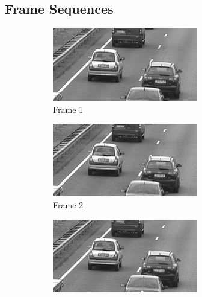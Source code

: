 \documentclass{article}
\begin{document}
\begin{enumerate}
\subsection{Frame Sequences}
\begin{figure}[h!]
    \centering
    \begin{subfigure}{0.24\textwidth}
        \centering
        \includegraphics[width=\linewidth]{../images/cars/frame = 1.png}
        \caption{Frame 1}
    \end{subfigure}
    \begin{subfigure}{0.24\textwidth}
        \centering
        \includegraphics[width=\linewidth]{../images/cars/frame = 2.png}
        \caption{Frame 2}
    \end{subfigure}
    \begin{subfigure}{0.24\textwidth}
        \centering
        \includegraphics[width=\linewidth]{../images/cars/frame = 3.png}

\end{subfigure}
\end{figure}
\end{enumerate}
\end{document}
